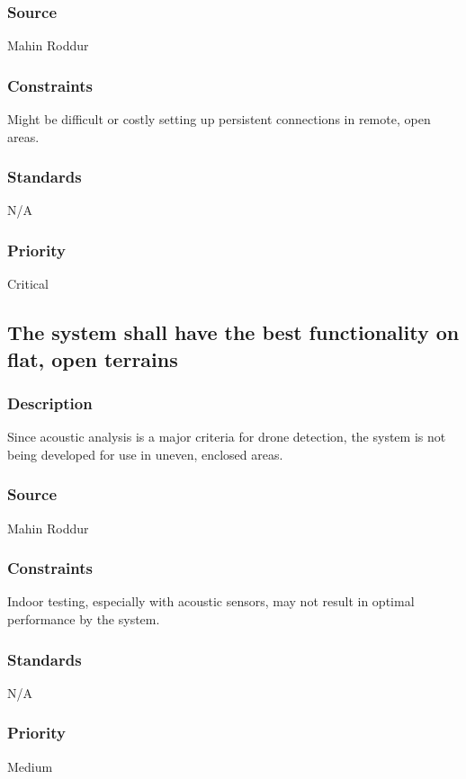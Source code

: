 \subsubsection{Source}
Mahin Roddur
\subsubsection{Constraints}
Might be difficult or costly setting up persistent connections in remote, open areas.
\subsubsection{Standards}
N/A
\subsubsection{Priority}
Critical

\subsection{The system shall have the best functionality on flat, open terrains}
\subsubsection{Description}
Since acoustic analysis is a major criteria for drone detection, the system is not being developed for use in uneven, enclosed areas.
\subsubsection{Source}
Mahin Roddur
\subsubsection{Constraints}
Indoor testing, especially with acoustic sensors, may not result in optimal performance by the system. 
\subsubsection{Standards}
N/A
\subsubsection{Priority}
Medium
